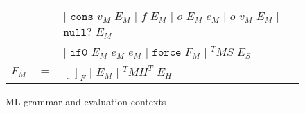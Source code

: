 \begin{figure}[p]
\begin{tabular}{lcl}
&& $\vert$ $\mathtt{cons}$ $v_{M}$ $E_{M}$ $\vert$ $f$ $E_{M}$ $\vert$ $o$ $E_{M}$ $e_{M}$ $\vert$ $o$ $v_{M}$ $E_{M}$ $\vert$ $\mathtt{null?}$ $E_{M}$ \\

\vspace{5pt}

&& $\vert$ $\mathtt{if0}$ $E_{M}$ $e_{M}$ $e_{M}$ $\vert$ $\mathtt{force}$ $F_{M}$ $\vert$ $^{T}MS$ $E_{S}$ \\

\vspace{5pt}

$F_{M}$ & $=$ & $[\,]_{F}$ $\vert$ $E_{M}$ $\vert$ $^{T}MH^{T}$ $E_{H}$
\end{tabular}
\caption{ML grammar and evaluation contexts}
\label{mg}
\end{figure}